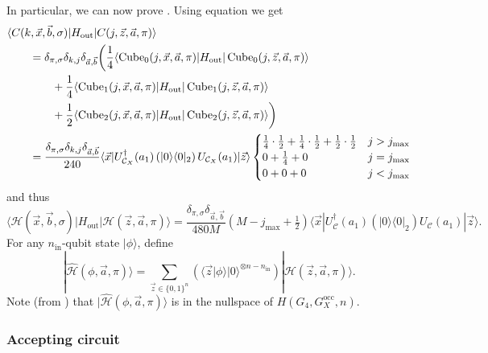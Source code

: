 \documentclass[../thesis-main/thesis-main]{subfiles}
\begin{document}
In particular, we can now prove . Using equation  we get
\begin{align}
&\langle C(k,\vec{x},\vec{b},\sigma)|H_{{\text{out}}}|C(j,\vec{z},\vec{a},\pi)\rangle \nonumber\\
&\qquad=\delta_{\pi,\sigma}\delta_{k,j}\delta_{\vec{a},\vec{b}}\bigg(\frac{1}{4}\langle \operatorname{Cube}_0(j,\vec{x},\vec{a},\pi)|H_{{\text{out}}}| \operatorname{Cube}_0(j,\vec{z},\vec{a},\pi)\rangle\nonumber\\
&\qquad\qquad +\frac{1}{4}\langle \operatorname{Cube}_1(j,\vec{x},\vec{a},\pi)|H_{{\text{out}}}| \operatorname{Cube}_1(j,\vec{z},\vec{a},\pi)\rangle \\
&\qquad\qquad+\frac{1}{2}\langle \operatorname{Cube}_2(j,\vec{x},\vec{a},\pi)|H_{{\text{out}}}| \operatorname{Cube}_2(j,\vec{z},\vec{a},\pi)\rangle\bigg)\\
&\qquad= \frac{\delta_{\pi,\sigma}\delta_{k,j}\delta_{\vec{a},\vec{b}}}{240}\langle\vec{x}|U_{\mathcal{C}_X}^{\dagger}(a_{1})\left(|0\rangle\langle0|_{2}\right)U_{\mathcal{C}_X}(a_{1})|\vec{z}\rangle \begin{cases}
\frac{1}{4}\cdot\frac{1}{2}+\frac{1}{4}\cdot\frac{1}{2}+\frac{1}{2}\cdot\frac{1}{2} & j>j_{\max}\\
0+\frac{1}{4}+0 & j=j_{\max}\\
0+0+0 & j<j_{\max}
\end{cases}
\end{align}
and thus
\begin{equation}
\langle\mathcal{H}(\vec{x},\vec{b},\sigma)|H_{{\text{out}}}|\mathcal{H}(\vec{z},\vec{a},\pi)\rangle
=\frac{\delta_{\pi,\sigma}\delta_{\vec{a},\vec{b}} }{480M}(M-j_{\max}+\tfrac{1}{2})\langle\vec{x}|U_{\mathcal{C}}^{\dagger}(a_{1})\left(|0\rangle\langle0|_{2}\right)U_{\mathcal{C}}(a_{1})|\vec{z}\rangle.\label{eq:history_hout_matels}
\end{equation}
For any $n_{{\text{in}}}$-qubit state $|\phi\rangle$, define 
\begin{equation}
|\mathcal{\widehat{H}}(\phi,\vec{a},\pi)\rangle=\sum_{\vec{z}\in\{0,1\}^{n}}\left(\langle\vec{z}|\phi\rangle|0\rangle^{\otimes n-n_{{\text{in}}}}\right)|\mathcal{H}(\vec{z},\vec{a},\pi)\rangle\label{eq:H_hat}.
\end{equation}
Note (from ) that $|\mathcal{\widehat{H}}(\phi,\vec{a},\pi)\rangle$ is in the nullspace of $H(G_{4},G_X^{\text{occ}},n)$.

\subsubsection{Accepting circuit}
\end{document}

